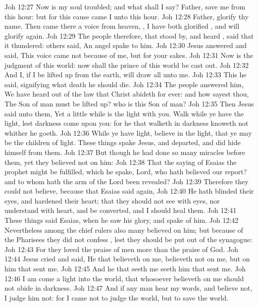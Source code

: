 \vs Joh 12:27 Now is my soul troubled; and what shall I say? Father, save me from this hour: but for this cause came I unto this hour.
\vs Joh 12:28 Father, glorify thy name. Then came there a voice from heaven, , I have both glorified , and will glorify  again.
\vs Joh 12:29 The people therefore, that stood by, and heard , said that it thundered: others said, An angel spake to him.
\vs Joh 12:30 Jesus answered and said, This voice came not because of me, but for your sakes.
\vs Joh 12:31 Now is the judgment of this world: now shall the prince of this world be cast out.
\vs Joh 12:32 And I, if I be lifted up from the earth, will draw all  unto me.
\vs Joh 12:33 This he said, signifying what death he should die.
\vs Joh 12:34 The people answered him, We have heard out of the law that Christ abideth for ever: and how sayest thou, The Son of man must be lifted up? who is this Son of man?
\vs Joh 12:35 Then Jesus said unto them, Yet a little while is the light with you. Walk while ye have the light, lest darkness come upon you: for he that walketh in darkness knoweth not whither he goeth.
\vs Joh 12:36 While ye have light, believe in the light, that ye may be the children of light. These things spake Jesus, and departed, and did hide himself from them.
\vs Joh 12:37 But though he had done so many miracles before them, yet they believed not on him:
\vs Joh 12:38 That the saying of Esaias the prophet might be fulfilled, which he spake, Lord, who hath believed our report? and to whom hath the arm of the Lord been revealed?
\vs Joh 12:39 Therefore they could not believe, because that Esaias said again,
\vs Joh 12:40 He hath blinded their eyes, and hardened their heart; that they should not see with  eyes, nor understand with  heart, and be converted, and I should heal them.
\vs Joh 12:41 These things said Esaias, when he saw his glory, and spake of him.
\vs Joh 12:42 Nevertheless among the chief rulers also many believed on him; but because of the Pharisees they did not confess , lest they should be put out of the synagogue:
\vs Joh 12:43 For they loved the praise of men more than the praise of God.
\vs Joh 12:44 Jesus cried and said, He that believeth on me, believeth not on me, but on him that sent me.
\vs Joh 12:45 And he that seeth me seeth him that sent me.
\vs Joh 12:46 I am come a light into the world, that whosoever believeth on me should not abide in darkness.
\vs Joh 12:47 And if any man hear my words, and believe not, I judge him not: for I came not to judge the world, but to save the world.
